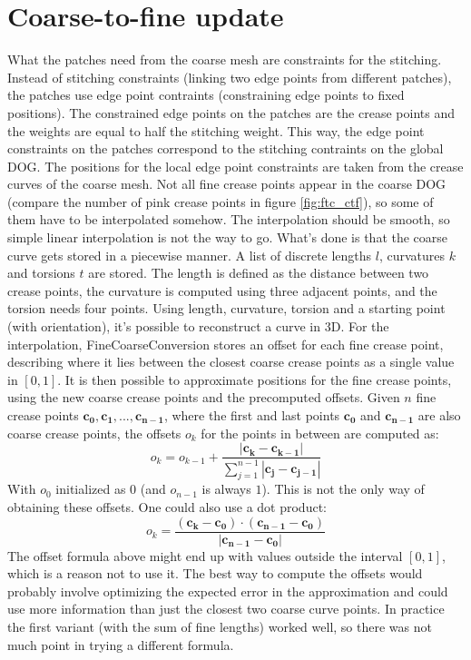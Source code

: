 \documentclass[a4paper,twoside,12pt,nochapterprefix]{scrbook}
\begin{document}
\section{Coarse-to-fine update}\label{sec:ctf_update}
What the patches need from the coarse mesh are constraints for the stitching. Instead of stitching constraints (linking two edge points from different patches), the patches use edge point contraints (constraining edge points to fixed positions). The constrained edge points on the patches are the crease points and the weights are equal to half the stitching weight. This way, the edge point constraints on the patches correspond to the stitching contraints on the global DOG.\newline
The positions for the local edge point constraints are taken from the crease curves of the coarse mesh. Not all fine crease points appear in the coarse DOG (compare the number of pink crease points in figure \ref{fig:ftc_ctf}), so some of them have to be interpolated somehow. The interpolation should be smooth, so simple linear interpolation is not the way to go.\newline
What's done is that the coarse curve gets stored in a piecewise manner. A list of discrete lengths $l$, curvatures $k$ and torsions $t$ are stored. The length is defined as the distance between two crease points, the curvature is computed using three adjacent points, and the torsion needs four points. Using length, curvature, torsion and a starting point (with orientation), it's possible to reconstruct a curve in 3D. For the interpolation, FineCoarseConversion stores an offset for each fine crease point, describing where it lies between the closest coarse crease points as a single value in $[0,1]$. It is then possible to approximate positions for the fine crease points, using the new coarse crease points and the precomputed offsets.
Given $n$ fine crease points $\mathbf{c_0}, \mathbf{c_1}, ..., \mathbf{c_{n-1}}$, where the first and last points $\mathbf{c_0}$ and $\mathbf{c_{n-1}}$ are also coarse crease points, the offsets $o_k$ for the points in between are computed as:
\begin{equation}
o_k = o_{k-1} + \frac{|\mathbf{c_k}-\mathbf{c_{k-1}}|}{\sum_{j=1}^{n-1}{|\mathbf{c_j}-\mathbf{c_{j-1}}|}}
\end{equation}
With $o_0$ initialized as $0$ (and $o_{n-1}$ is always $1$). This is not the only way of obtaining these offsets. One could also use a dot product:
\begin{equation}
o_k = \frac{(\mathbf{c_k}-\mathbf{c_0}) \cdot (\mathbf{c_{n-1}}-\mathbf{c_0})}{|\mathbf{c_{n-1}}-\mathbf{c_0}|}
\end{equation}
The offset formula above might end up with values outside the interval $[0,1]$, which is a reason not to use it. The best way to compute the offsets would probably involve optimizing the expected error in the approximation and could use more information than just the closest two coarse curve points. In practice the first variant (with the sum of fine lengths) worked well, so there was not much point in trying a different formula.\newline
\end{document}
